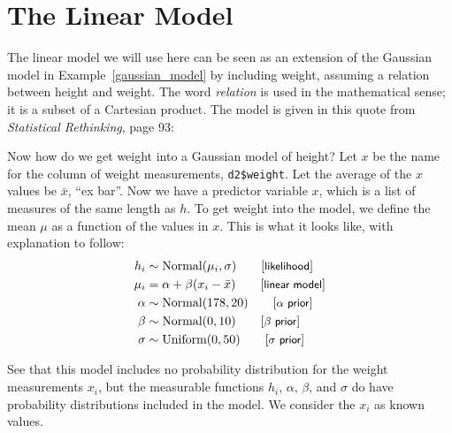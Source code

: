 \documentclass[
twoside=true,
paper=letter,
fontsize=9pt,
pagesize=auto,
leqno,
openany,
headsepline,
overfullrule,
]{scrbook}
\makeatletter
\newcommand{\reqnomode}{\tagsleft@false}
\theoremstyle{plain}
\theoremstyle{plain}
\theoremstyle{definition}
\theoremstyle{bfnoteitalic}
\theoremstyle{bfnoteroman}
\makeatother
\begin{document}
\section{The Linear Model}\label{linear_model}
The linear model we will use here can be seen as an extension of the Gaussian model in
Example~\ref{gaussian_model} by including weight, assuming a relation between height and weight.  The word  \emph{relation} is used  in the mathematical sense; it is a subset of a Cartesian product.
The model is given in this quote from \textsl{Statistical Rethinking}, page 93:
\begin{quoting}\small
Now how do we get weight into a Gaussian model of height? Let $x$ be the name for the
column of weight measurements, \texttt{d2\$weight}.
Let the average of the $x$ values be $\bar x$, ``ex bar''.
Now we have a predictor variable $x$, which is a list of measures of the same length as $h$. To get
weight into the model, we define the mean $\mu$ as a function of the values in $x$. This is what it
looks like, with explanation to follow:\reqnomode
\begin{align*}
h_i    & \sim \text{Normal}(\mu_i,\sigma) \tag*{[\textsf{\small likelihood}]}    \\
\mu_i  & = \alpha + \beta(x_i - \bar x)   \tag*{[\textsf{\small linear model}]}  \\
\alpha & \sim \text{Normal}(178,20)       \tag*{[\textsf{\small $\alpha$ prior}]}\\  
\beta  & \sim \text{Normal}(0,10)         \tag*{[\textsf{\small $\beta$ prior}]}   \\
\sigma & \sim \text{Uniform}(0,50)        \tag*{[\textsf{\small $\sigma$ prior}]} \\
\end{align*}
\end{quoting}
See that this model includes no probability distribution for the weight measurements $x_i$, but the measurable functions $h_i$, $\alpha$, $\beta$, and $\sigma$ do have probability distributions included in the model. We consider the $x_i$ as known values.
\end{document}
